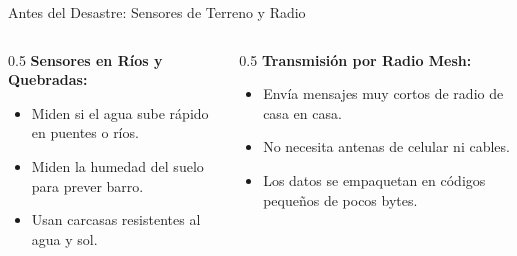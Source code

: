 \documentclass[aspectratio=169]{beamer}
\begin{document}
\begin{frame}{Antes del Desastre: Sensores de Terreno y Radio}
  \begin{columns}
    \begin{column}{0.5\textwidth}
      \textbf{Sensores en Ríos y Quebradas:}
      \begin{itemize}
        \item Miden si el agua sube rápido en puentes o ríos.
        \item Miden la humedad del suelo para prever barro.
        \item Usan carcasas resistentes al agua y sol.
      \end{itemize}
    \end{column}
    \begin{column}{0.5\textwidth}
      \textbf{Transmisión por Radio Mesh:}
      \begin{itemize}
        \item Envía mensajes muy cortos de radio de casa en casa.
        \item No necesita antenas de celular ni cables.
        \item Los datos se empaquetan en códigos pequeños de pocos bytes.
      \end{itemize}
    \end{column}
  \end{columns}

  \vspace{0.4cm}
  \centering
\end{frame}
\end{document}

